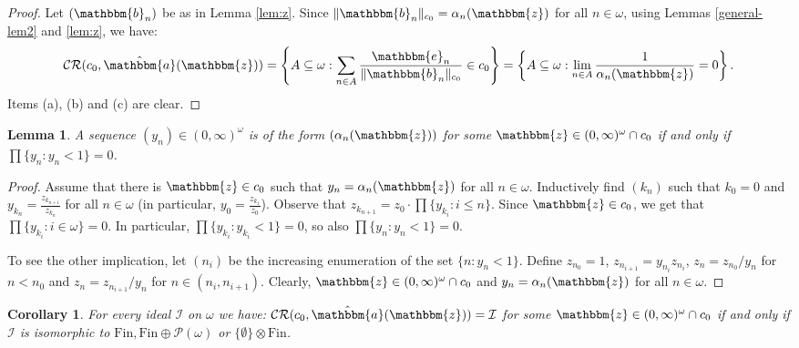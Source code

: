 \documentclass{amsart}
\newcommand{\I}{\mathcal{I}}
\newcommand{\Fin}{\mathrm{Fin}}
\newcommand{\CR}{\mathcal{CR}}
\newcommand{\w}{\mathbbm}
\newtheorem{lemma}[theorem]{Lemma}
\newtheorem{corollary}[theorem]{Corollary}
\begin{document}
\begin{proof}
Let $(\w{b}_n)$ be as in Lemma \ref{lem:z}. Since $\|\w{b}_n\|_{c_0}=\alpha_n(\w{z})$ for all $n\in\omega$, using Lemmas \ref{general-lem2} and \ref{lem:z}, we have:
\[
\CR(c_0,\hat{\w{a}}(\w{z}))=\left\{A\subseteq\omega:\sum_{n\in A}\frac{\w{e}_n}{\|\w{b}_n\|_{c_0}}\in c_0\right\}=\left\{A\subseteq\omega: \lim_{n\in A}\frac{1}{\alpha_n(\w{z})}=0\right\}.
\]
Items (a), (b) and (c) are clear.
\end{proof}

\begin{lemma}
\label{L:alphy}
A sequence $(y_n) \in(0,\infty)^\omega$ is of the form $(\alpha_n(\w{z}))$ for some $\w{z}\in (0,\infty)^\omega\cap c_0$ if and only if $\prod \{y_n : y_n <1\}=0$.
\end{lemma}

\begin{proof}
Assume that there is $\w{z}\in c_0$ such that $y_n=\alpha_n(\w{z})$ for all $n\in\omega$. Inductively find $(k_n)$ such that $k_0=0$ and $y_{k_n}=\frac{z_{k_{n+1}}}{z_{k_n}}$ for all $n\in\omega$ (in particular, $y_0=\frac{z_{k_1}}{z_0}$). Observe that $z_{k_{n+1}}=z_0\cdot \prod \{y_{k_i} : i\leq n\}$. Since $\w{z}\in c_0$, we get that $\prod \{y_{k_i} : i\in\omega\}=0$. In particular, $\prod \{y_{k_i} : y_{k_i}<1\}=0$, so also $\prod \{y_n : y_n <1\}=0$.

To see the other implication, let $(n_i)$ be the increasing enumeration of the set $\{n : y_n <1\}$. Define $z_{n_0}=1$, $z_{n_{i+1}}=y_{n_i} z_{n_i}$, $z_n = z_{n_0}/y_n$ for $n<n_0$ and $z_n=z_{n_{i+1}}/y_n$ for $n\in (n_i, n_{i+1})$. Clearly, $\w{z}\in (0,\infty)^\omega\cap c_0$ and $y_n=\alpha_n(\w{z})$ for all $n\in\omega$.
\end{proof}

\begin{corollary}
\label{char:c_0-2}
For every ideal $\I$ on $\omega$ we have: $\CR(c_0,\hat{\w{a}}(\w{z}))=\I$ for some $\w{z}\in (0,\infty)^\omega\cap c_0$ if and only if $\I$ is isomorphic to $\Fin, \Fin\oplus\mathcal{P}(\omega)$ or $\{\emptyset\}\otimes\Fin$.
\end{corollary}
\end{document}
